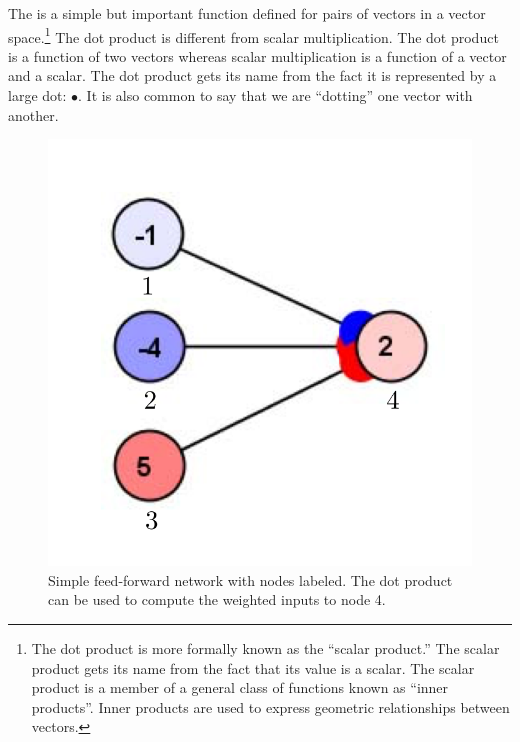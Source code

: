 
 The  is a simple but important function defined 
for pairs of vectors in a vector space.\footnote{The dot product is more 
formally known as the ``scalar product.'' The scalar product gets its name from 
the fact that its value is a scalar. The scalar product is a member 
of a general class of functions known as ``inner products''. Inner products 
are used to express geometric relationships between vectors.}  The dot 
product is different from scalar multiplication. The dot product is a
function of two vectors whereas scalar multiplication is a function of a vector
and a scalar. The dot product gets its name from the fact it is represented by 
a large dot: $\bullet$. It is also common to say that we are ``dotting'' one 
vector with another.
\begin{figure}[h]
\centering
\includegraphics[scale=.7]{./images/Simple3Labelled.png}
\caption[Simbrain screenshot.]{Simple feed-forward network with nodes labeled. The dot product can be used to compute the weighted inputs to node 4.}
\label{F:simplelabelled}
\end{figure}

